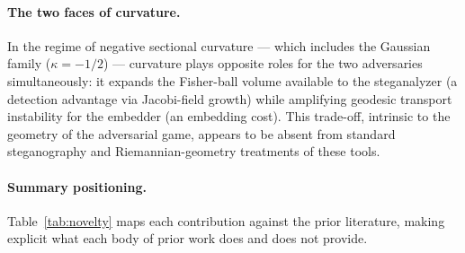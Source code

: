 \documentclass[a4paper,fleqn]{cas-dc}
\begin{document}
\paragraph{The two faces of curvature.}
In the regime of negative sectional curvature --- which includes the Gaussian
family ($\kappa = -1/2$) --- curvature plays opposite roles for the two
adversaries simultaneously: it expands the Fisher-ball volume available to the
steganalyzer (a detection advantage via Jacobi-field growth) while amplifying
geodesic transport instability for the embedder (an embedding cost).
This trade-off, intrinsic to the geometry of the adversarial game, appears to
be absent from standard steganography and Riemannian-geometry treatments of
these tools.

\paragraph{Summary positioning.}
Table~\ref{tab:novelty} maps each contribution against the prior literature,
making explicit what each body of prior work does and does not provide.
\end{document}
